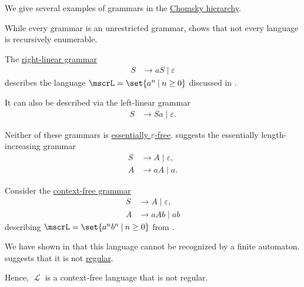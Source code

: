 \begin{example}\label{ex:def:chomsky_hierarchy}
  We give several examples of grammars in the \hyperref[def:chomsky_hierarchy]{Chomsky hierarchy}.

  \begin{thmenum}
     While every grammar is an unrestricted grammar,  shows that not every language is recursively enumerable.

     The \hyperref[def:chomsky_hierarchy/regular]{right-linear grammar}
    \begin{equation*}
      \begin{aligned}
        S &\to aS \mid \varepsilon
      \end{aligned}
    \end{equation*}
    describes the language \( \mscrL = \set{ a^n \given n \geq 0 } \) discussed in .

    It can also be described via the left-linear grammar
    \begin{equation*}
      \begin{aligned}
        S &\to Sa \mid \varepsilon.
      \end{aligned}
    \end{equation*}

    Neither of these grammars is \hyperref[def:epsilon_free_grammar]{essentially \( \varepsilon \)-free}.  suggests the essentially length-increasing grammar
    \begin{equation*}
      \begin{aligned}
        S &\to A \mid \varepsilon, \\
        A &\to aA \mid a.
      \end{aligned}
    \end{equation*}

     Consider the \hyperref[def:chomsky_hierarchy/context_free]{context-free grammar}
    \begin{equation*}
      \begin{aligned}
        S &\to A \mid \varepsilon, \\
        A &\to aAb \mid ab
      \end{aligned}
    \end{equation*}
    describing \( \mscrL = \set{ a^n b^n \given n \geq 0 } \) from .

    We have shown in  that this language cannot be recognized by a finite automaton.  suggests that it is not \hyperref[def:chomsky_hierarchy/regular]{regular}.

    Hence, \( \mscrL \) is a context-free language that is not regular.
  \end{thmenum}
\end{example}

